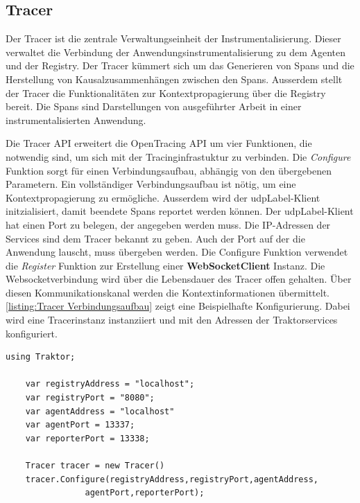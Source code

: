 \subsection{Tracer}
\label{subsection:Tracer}
Der Tracer ist die zentrale Verwaltungseinheit der Instrumentalisierung. Dieser verwaltet die Verbindung der Anwendungsinstrumentalisierung zu dem Agenten und der Registry. Der Tracer kümmert sich um das Generieren von Spans und die Herstellung von Kausalzusammenhängen zwischen den Spans. Ausserdem stellt der Tracer die Funktionalitäten zur Kontextpropagierung über die Registry bereit. Die Spans sind Darstellungen von ausgeführter Arbeit in einer instrumentalisierten Anwendung. 

Die Tracer API erweitert die OpenTracing API um vier Funktionen, die notwendig sind, um sich mit der Tracinginfrastuktur zu verbinden. Die \emph{Configure} Funktion sorgt für einen Verbindungsaufbau, abhängig von den übergebenen Parametern. Ein vollständiger Verbindungsaufbau ist nötig, um eine Kontextpropagierung zu ermögliche. Ausserdem wird der \gls{udpLabel}-Klient initzialisiert, damit beendete Spans reportet werden können. Der \gls{udpLabel}-Klient hat einen Port zu belegen, der angegeben werden muss. Die IP-Adressen der Services sind dem Tracer bekannt zu geben. Auch der Port auf der die Anwendung lauscht, muss übergeben werden. Die Configure Funktion verwendet die \emph{Register} Funktion zur Erstellung einer \textbf{WebSocketClient} Instanz. Die Websocketverbindung wird über die Lebensdauer des Tracer offen gehalten. Über diesen Kommunikationskanal werden die Kontextinformationen übermittelt. \cref{listing:Tracer Verbindungsaufbau} zeigt eine Beispielhafte Konfigurierung. Dabei wird eine Tracerinstanz instanziiert und mit den Adressen der Traktorservices konfiguriert.

\begin{minipage}[]{\textwidth}
	\begin{lstlisting}[frame=trBL]
	using Traktor;
	
	var registryAddress = "localhost";
	var registryPort = "8080";
	var agentAddress = "localhost"
	var agentPort = 13337;
	var reporterPort = 13338;
	
	Tracer tracer = new Tracer()
	tracer.Configure(registryAddress,registryPort,agentAddress,
				agentPort,reporterPort);
	
	\end{lstlisting}
	\label{listing:Tracer Verbindungsaufbau}
\end{minipage} 

